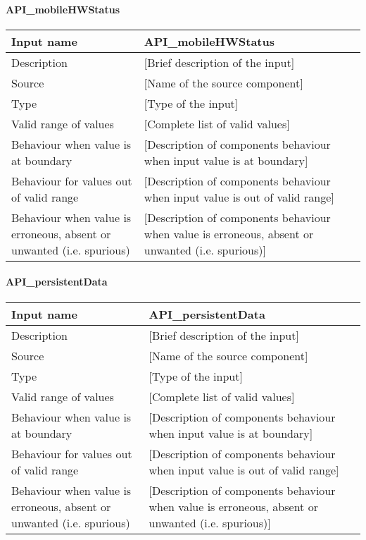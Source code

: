 \paragraph{API\_mobileHWStatus}

\begin{longtable}{p{}p{}}
\toprule
Input name				& API\_mobileHWStatus \\
\midrule
Description				& [Brief description of the input] \\
\midrule
Source					& [Name of the source component] \\ 
\midrule
Type					& [Type of the input] \\
\midrule
Valid range of values	& [Complete list of valid values] \\
\midrule
Behaviour when value is at boundary	& [Description of components behaviour when input value is at boundary] \\
\midrule
Behaviour for values out of valid range	& [Description of components behaviour when input value is out of valid range] \\
\midrule
Behaviour when value is erroneous, absent or unwanted (i.e. spurious) & [Description of components behaviour when value is erroneous, absent or unwanted (i.e. spurious)] \\
\bottomrule
\end{longtable}

\paragraph{API\_persistentData}

\begin{longtable}{p{}p{}}
\toprule
Input name				& API\_persistentData \\
\midrule
Description				& [Brief description of the input] \\
\midrule
Source					& [Name of the source component] \\ 
\midrule
Type					& [Type of the input] \\
\midrule
Valid range of values	& [Complete list of valid values] \\
\midrule
Behaviour when value is at boundary	& [Description of components behaviour when input value is at boundary] \\
\midrule
Behaviour for values out of valid range	& [Description of components behaviour when input value is out of valid range] \\
\midrule
Behaviour when value is erroneous, absent or unwanted (i.e. spurious) & [Description of components behaviour when value is erroneous, absent or unwanted (i.e. spurious)] \\
\bottomrule
\end{longtable}



